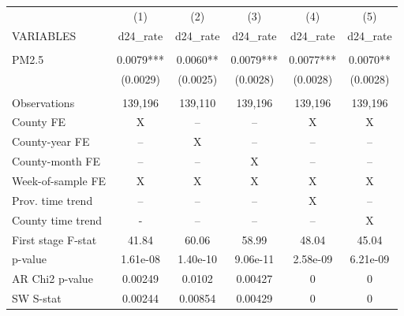 \begin{tabular}{lccccc} \hline
 & (1) & (2) & (3) & (4) & (5) \\
VARIABLES & d24\_rate & d24\_rate & d24\_rate & d24\_rate & d24\_rate \\ \hline
 &  &  &  &  &  \\
PM2.5 & 0.0079*** & 0.0060** & 0.0079*** & 0.0077*** & 0.0070** \\
 & (0.0029) & (0.0025) & (0.0028) & (0.0028) & (0.0028) \\
 &  &  &  &  &  \\
Observations & 139,196 & 139,110 & 139,196 & 139,196 & 139,196 \\
County FE & X & -- & -- & X & X \\
County-year FE & -- & X & -- & -- & -- \\
County-month FE & -- & -- & X & -- & -- \\
Week-of-sample FE & X & X & X & X & X \\
Prov. time trend & -- & -- & -- & X & -- \\
County time trend & - & -- & -- & -- & X \\
First stage F-stat & 41.84 & 60.06 & 58.99 & 48.04 & 45.04 \\
p-value & 1.61e-08 & 1.40e-10 & 9.06e-11 & 2.58e-09 & 6.21e-09 \\
AR Chi2 p-value & 0.00249 & 0.0102 & 0.00427 & 0 & 0 \\
 SW S-stat & 0.00244 & 0.00854 & 0.00429 & 0 & 0 \\ \hline
\end{tabular}
